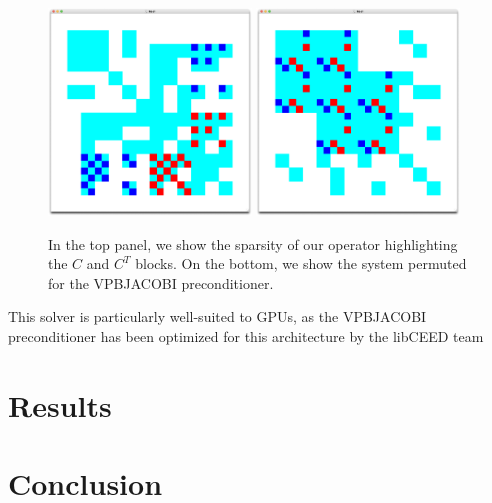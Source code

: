 \documentclass[twoside,leqno,twocolumn]{article}
\begin{document}
\begin{figure}
\centering
\includegraphics[width=0.48\textwidth]{figures/TwoFaultSystem.png}
\includegraphics[width=0.48\textwidth]{figures/TwoFaultSystemPerm.png}
\caption{In the top panel, we show the sparsity of our operator highlighting the $C$ and $C^T$ blocks. On the bottom, we show the system permuted for the VPBJACOBI preconditioner.\label{fig:sparsityC}}
\end{figure}

This solver is particularly well-suited to GPUs, as the VPBJACOBI preconditioner has been optimized for this architecture by the libCEED team~\cite{brownbarrabeamsghaffariknepleymosesshakeristengelthompsonzhang2022}

\section{Results}

\section{Conclusion}



\end{document}
